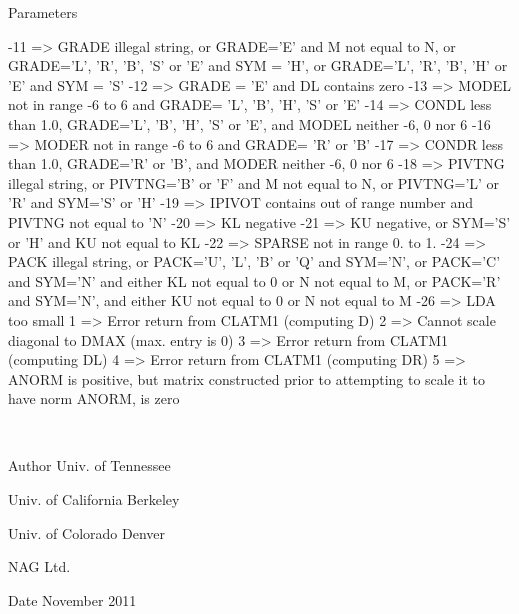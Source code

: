 \begin{DoxyParams}[1]{Parameters}
\begin{DoxyVerb}
           -11 => GRADE illegal string, or GRADE='E' and
                  M not equal to N, or GRADE='L', 'R', 'B', 'S' or 'E'
                  and SYM = 'H', or GRADE='L', 'R', 'B', 'H' or 'E'
                  and SYM = 'S'
           -12 => GRADE = 'E' and DL contains zero
           -13 => MODEL not in range -6 to 6 and GRADE= 'L', 'B', 'H',
                  'S' or 'E'
           -14 => CONDL less than 1.0, GRADE='L', 'B', 'H', 'S' or 'E',
                  and MODEL neither -6, 0 nor 6
           -16 => MODER not in range -6 to 6 and GRADE= 'R' or 'B'
           -17 => CONDR less than 1.0, GRADE='R' or 'B', and
                  MODER neither -6, 0 nor 6
           -18 => PIVTNG illegal string, or PIVTNG='B' or 'F' and
                  M not equal to N, or PIVTNG='L' or 'R' and SYM='S'
                  or 'H'
           -19 => IPIVOT contains out of range number and
                  PIVTNG not equal to 'N'
           -20 => KL negative
           -21 => KU negative, or SYM='S' or 'H' and KU not equal to KL
           -22 => SPARSE not in range 0. to 1.
           -24 => PACK illegal string, or PACK='U', 'L', 'B' or 'Q'
                  and SYM='N', or PACK='C' and SYM='N' and either KL
                  not equal to 0 or N not equal to M, or PACK='R' and
                  SYM='N', and either KU not equal to 0 or N not equal
                  to M
           -26 => LDA too small
             1 => Error return from CLATM1 (computing D)
             2 => Cannot scale diagonal to DMAX (max. entry is 0)
             3 => Error return from CLATM1 (computing DL)
             4 => Error return from CLATM1 (computing DR)
             5 => ANORM is positive, but matrix constructed prior to
                  attempting to scale it to have norm ANORM, is zero\end{DoxyVerb}
 \\
\hline
\end{DoxyParams}
\begin{DoxyAuthor}{Author}
Univ. of Tennessee 

Univ. of California Berkeley 

Univ. of Colorado Denver 

N\+A\+G Ltd. 
\end{DoxyAuthor}
\begin{DoxyDate}{Date}
November 2011 
\end{DoxyDate}
\hypertarget{group__complex__matgen_ga411f64e8d8b980e985c6b0189139dc49}{}
